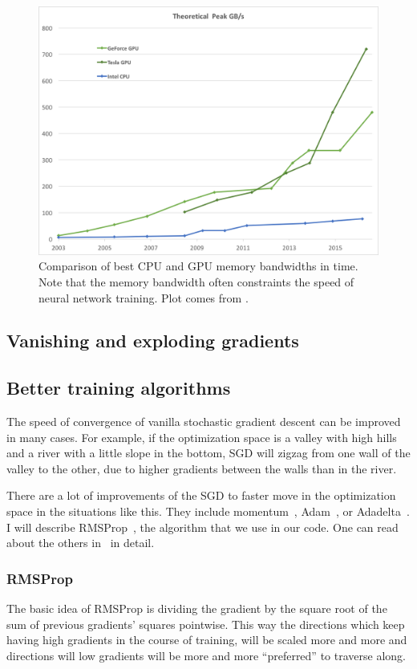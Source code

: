 \begin{figure}[h]
  \includegraphics[width=\linewidth]{images/gpu-bandwidth.png}
  \caption{Comparison of best CPU and GPU memory bandwidths in time. Note that the memory bandwidth often constraints the speed of neural network training. Plot comes from \cite{nvidia-docs}.}\label{nvidia-speed}
\end{figure}

\subsection{Vanishing and exploding gradients}

\subsection{Better training algorithms}
The speed of convergence of vanilla stochastic gradient descent can be improved in many cases. For example, if the optimization space is a valley with high hills and a river with a little slope in the bottom, SGD will zigzag from one wall of the valley to the other, due to higher gradients between the walls than in the river. 

There are a lot of improvements of the SGD to faster move in the optimization space in the situations like this. They include momentum~\cite{momentum}, Adam~\cite{adam}, or Adadelta~\cite{adadelta}. I will describe RMSProp~\cite{rmsprop}, the algorithm that we use in our code. One can read about the others in~\cite[chapter 8.3.]{dlbook} in detail.

\subsubsection{RMSProp}\label{rmsprop-section}
The basic idea of RMSProp is dividing the gradient by the square root of the sum of previous gradients' squares pointwise. This way the directions which keep having high gradients in the course of training, will be scaled more and more and directions will low gradients will be more and more ``preferred'' to traverse along.

